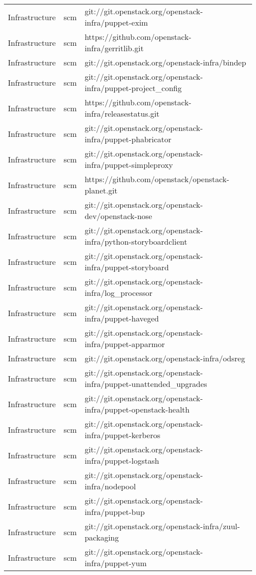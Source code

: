 \begin{center}
\begin{longtable}{|p{4cm}|p{1cm}|p{10cm}|}
Infrastructure&scm&git://git.openstack.org/openstack-infra/puppet-exim\\ 
Infrastructure&scm&https://github.com/openstack-infra/gerritlib.git\\ 
Infrastructure&scm&git://git.openstack.org/openstack-infra/bindep\\ 
Infrastructure&scm&git://git.openstack.org/openstack-infra/puppet-project\_config\\ 
Infrastructure&scm&https://github.com/openstack-infra/releasestatus.git\\ 
Infrastructure&scm&git://git.openstack.org/openstack-infra/puppet-phabricator\\ 
Infrastructure&scm&git://git.openstack.org/openstack-infra/puppet-simpleproxy\\ 
Infrastructure&scm&https://github.com/openstack/openstack-planet.git\\ 
Infrastructure&scm&git://git.openstack.org/openstack-dev/openstack-nose\\ 
Infrastructure&scm&git://git.openstack.org/openstack-infra/python-storyboardclient\\ 
Infrastructure&scm&git://git.openstack.org/openstack-infra/puppet-storyboard\\ 
Infrastructure&scm&git://git.openstack.org/openstack-infra/log\_processor\\ 
Infrastructure&scm&git://git.openstack.org/openstack-infra/puppet-haveged\\ 
Infrastructure&scm&git://git.openstack.org/openstack-infra/puppet-apparmor\\ 
Infrastructure&scm&git://git.openstack.org/openstack-infra/odsreg\\ 
Infrastructure&scm&git://git.openstack.org/openstack-infra/puppet-unattended\_upgrades\\ 
Infrastructure&scm&git://git.openstack.org/openstack-infra/puppet-openstack-health\\ 
Infrastructure&scm&git://git.openstack.org/openstack-infra/puppet-kerberos\\ 
Infrastructure&scm&git://git.openstack.org/openstack-infra/puppet-logstash\\ 
Infrastructure&scm&git://git.openstack.org/openstack-infra/nodepool\\ 
Infrastructure&scm&git://git.openstack.org/openstack-infra/puppet-bup\\ 
Infrastructure&scm&git://git.openstack.org/openstack-infra/zuul-packaging\\ 
Infrastructure&scm&git://git.openstack.org/openstack-infra/puppet-yum\\ 

\end{longtable}
\end{center}
